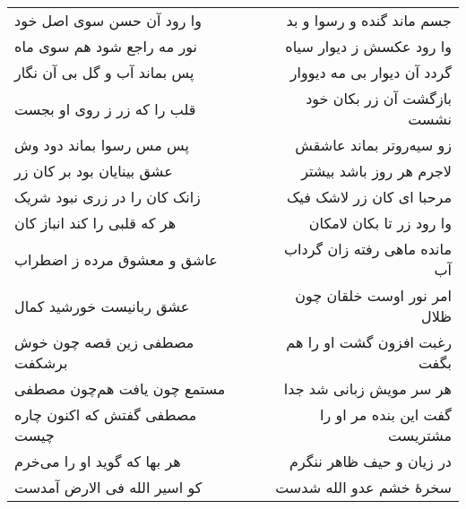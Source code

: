 \begin{center}
\begin{longtable}{l p{0.5cm} r}
\\
وا رود آن حسن سوی اصل خود
&&
جسم ماند گنده و رسوا و بد
\\
نور مه راجع شود هم سوی ماه
&&
وا رود عکسش ز دیوار سیاه
\\
پس بماند آب و گل بی آن نگار
&&
گردد آن دیوار بی مه دیووار
\\
قلب را که زر ز روی او بجست
&&
بازگشت آن زر بکان خود نشست
\\
پس مس رسوا بماند دود وش
&&
زو سیه‌روتر بماند عاشقش
\\
عشق بینایان بود بر کان زر
&&
لاجرم هر روز باشد بیشتر
\\
زانک کان را در زری نبود شریک
&&
مرحبا ای کان زر لاشک فیک
\\
هر که قلبی را کند انباز کان
&&
وا رود زر تا بکان لامکان
\\
عاشق و معشوق مرده ز اضطراب
&&
مانده ماهی رفته زان گرداب آب
\\
عشق ربانیست خورشید کمال
&&
امر نور اوست خلقان چون ظلال
\\
مصطفی زین قصه چون خوش برشکفت
&&
رغبت افزون گشت او را هم بگفت
\\
مستمع چون یافت هم‌چون مصطفی
&&
هر سر مویش زبانی شد جدا
\\
مصطفی گفتش که اکنون چاره چیست
&&
گفت این بنده مر او را مشتریست
\\
هر بها که گوید او را می‌خرم
&&
در زیان و حیف ظاهر ننگرم
\\
کو اسیر الله فی الارض آمدست
&&
سخرهٔ خشم عدو الله شدست
\\
\end{longtable}
\end{center}
